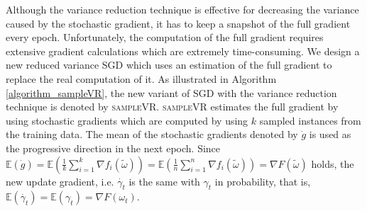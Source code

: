 \documentclass[letterpaper]{article}
\begin{document}
Although  the variance reduction technique is effective for decreasing the variance caused by the stochastic gradient, it has to keep a snapshot of the full gradient  every epoch. Unfortunately, the computation of the full gradient requires extensive gradient calculations which  are extremely time-consuming.  We design a new reduced variance SGD which uses an estimation of the full gradient to replace the real computation of it.  As illustrated in Algorithm \ref{algorithm_sampleVR}, the new variant of SGD with the variance reduction technique is denoted by \textsc{sampleVR}.  \textsc{sampleVR} estimates the full gradient by using  stochastic gradients which are computed by using $k$ sampled  instances  from the training data.  The mean of the stochastic gradients denoted by $\dot{g}$ is used as the progressive direction in the next epoch. Since  $\mathbb{E}(\dot{g}) \mathrm{=} \mathbb{E} \left(  \frac{1}{k}\sum\limits_{i=1}^k\nabla f_i(\tilde{\omega}) \right) \mathrm{=}  \mathbb{E} \left (\frac{1}{n}\sum\limits_{i=1}^n\nabla f_i(\tilde{\omega}) \right)  \mathrm{=}  \nabla F(\tilde{\omega})$ holds, the new update gradient, i.e. $\dot{\gamma_t}$ is the same with $\gamma_t$ in probability, that is, $\mathbb{E} (  \dot{\gamma_t}) = \mathbb{E} (\gamma_t) = \nabla F(\omega_{t})$. 
\end{document}
